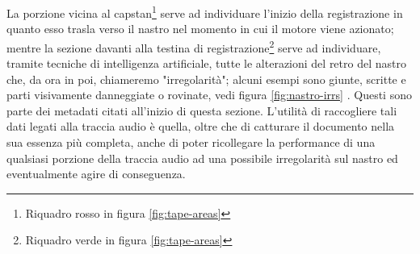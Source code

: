 La porzione vicina al capstan\footnote{Riquadro rosso in figura \ref{fig:tape-areas}} serve ad individuare l'inizio della registrazione in quanto esso trasla verso il nastro nel momento in cui il motore viene azionato; mentre la sezione davanti alla testina di registrazione\footnote{Riquadro verde in figura \ref{fig:tape-areas}} serve ad individuare, tramite tecniche di intelligenza artificiale, tutte le alterazioni del retro del nastro che, da ora in poi, chiameremo "irregolarità"; alcuni esempi sono giunte, scritte e parti visivamente danneggiate o rovinate, vedi figura \ref{fig:nastro-irrs} \cite{gravaTesiVideoAnalyser2019}.
Questi sono parte dei metadati citati all'inizio di questa sezione.
L'utilità di raccogliere tali dati legati alla traccia audio è quella, oltre che di catturare il documento nella sua essenza più completa, anche di poter ricollegare la performance di una qualsiasi porzione della traccia audio ad una possibile irregolarità sul nastro ed eventualmente agire di conseguenza.

